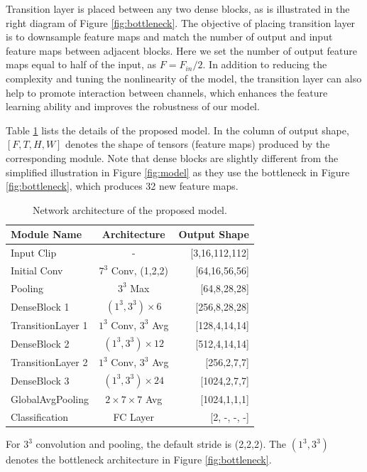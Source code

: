 \documentclass[10pt,twocolumn,letterpaper]{article}
\begin{document}
Transition layer is placed between any two dense blocks, as is illustrated in the right diagram of Figure \ref{fig:bottleneck}.
The objective of placing transition layer is to downsample feature maps and match the number of output and input feature maps between adjacent blocks.
Here we set the number of output feature maps equal to half of the input, as $F = F_{in}/2$.
In addition to reducing the complexity and tuning the nonlinearity of the model, the transition layer can also help to promote interaction between channels, which enhances the feature learning ability and improves the robustness of our model.

Table \ref{table:arch} lists the details of the proposed model.
In the column of output shape, $[F, T, H, W]$ denotes the shape of tensors (feature maps) produced by the corresponding module.
Note that dense blocks are slightly different from the simplified illustration in Figure \ref{fig:model} as they use the bottleneck in Figure \ref{fig:bottleneck}, which produces 32 new feature maps. 


\begin{table}[t]
\begin{center}
\caption{Network architecture of the proposed model.}
\label{table:arch}
\begin{tabular}{lcr}
\hline
\textbf{Module Name} & \textbf{Architecture} & \textbf{Output Shape} \\
\hline\hline
Input Clip & - & [3,16,112,112] \\
Initial Conv & $7^3$ Conv, (1,2,2) & [64,16,56,56] \\
Pooling & $3^3$ Max & [64,8,28,28] \\
DenseBlock 1 & $(1^3, 3^3) \times 6$ & [256,8,28,28] \\
TransitionLayer 1 & $1^3$ Conv, $3^3$ Avg & [128,4,14,14]\\
DenseBlock 2 & $(1^3, 3^3) \times 12$ & [512,4,14,14] \\
TransitionLayer 2 & $1^3$ Conv, $3^3$ Avg & [256,2,7,7] \\
DenseBlock 3 & $(1^3, 3^3) \times 24$ & [1024,2,7,7]\\
GlobalAvgPooling & $2 \times 7 \times 7$ Avg & [1024,1,1,1]\\
Classification & FC Layer & [2, -, -, -] \\
\hline
\end{tabular}
\end{center}
\footnotesize
For $3^3$ convolution and pooling, the default stride is (2,2,2). The $(1^3, 3^3)$ denotes the bottleneck architecture in Figure \ref{fig:bottleneck}.
\end{table}
\end{document}
